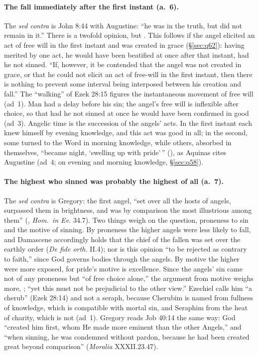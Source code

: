 \paragraph{The fall immediately after the first instant (a.~6).} The
\emph{sed contra} is John 8:44 with Augustine: ``he was in the truth,
but did not remain in it.'' There is a twofold opinion, but . This follows if
the angel elicited an act of free will in the first instant and was
created in grace (\S\ref{sec:q62}): having merited by one act, he would
have been beatified at once after that instant, had he not sinned. ``If,
however, it be contended that the angel was not created in grace, or
that he could not elicit an act of free-will in the first instant, then
there is nothing to prevent some interval being interposed between his
creation and fall.'' The ``walking'' of Ezek 28:15 figures the
instantaneous movement of free will (ad~1). Man had a delay before his
sin; the angel's free will is inflexible after choice, so that had he
not sinned at once he would have been confirmed in good (ad~3). Angelic
time is the succession of the angels' acts. In the first instant each
knew himself by evening knowledge, and this act was good in all; in the
second, some turned to the Word in morning knowledge, while others,
absorbed in themselves, ``became night, `swelling up with pride'\,''
(), as Aquinas cites
Augustine (ad~4; on evening and morning knowledge, \S\ref{sec:q58}).

\paragraph{The highest who sinned was probably the highest of all
(a.~7).} The \emph{sed contra} is Gregory: the first angel, ``set over
all the hosts of angels, surpassed them in brightness, and was by
comparison the most illustrious among them'' (,
\emph{Hom.~in Ev.} 34.7). Two things weigh on the
question, proneness to sin and the motive of sinning. By proneness the
higher angels were less likely to fall, and Damascene accordingly holds
that the chief of the fallen was set over the earthly order (\emph{De
fide orth.} II.4); nor is this opinion ``to be rejected as contrary to
faith,'' since God governs bodies through the angels. By motive the
higher were more exposed, for pride's motive is excellence. Since the
angels' sin came not of any proneness but ``of free choice alone,'' the
argument from motive weighs more, ;
``yet this must not be prejudicial to the other view.'' Ezechiel calls
him ``a cherub'' (Ezek 28:14) and not a seraph, because Cherubim is
named from fullness of knowledge, which is compatible with mortal sin,
and Seraphim from the heat of charity, which is not (ad~1). Gregory reads
Job 40:14 the same way: God ``created him first, whom He made more
eminent than the other Angels,'' and ``when sinning, he was condemned
without pardon, because he had been created great beyond comparison''
(\emph{Moralia} XXXII.23.47).

